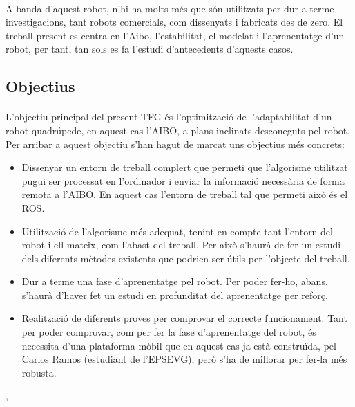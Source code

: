 \documentclass[12pt,a4paper,final,twoside]{article}
\begin{document}
\paragraph{}A banda d'aquest robot, n'hi ha molts més que són utilitzats per dur a terme investigacions, tant robots comercials, com dissenyats i fabricats des de zero. El treball present es centra en l'Aibo, l'estabilitat, el modelat i l'aprenentatge d'un robot, per tant, tan sols es fa l'estudi d'antecedents d'aquests casos.

\label{Objectius}
\subsection{Objectius}

\paragraph{}L'objectiu principal del present TFG és l'optimització de l'adaptabilitat d'un robot quadrúpede, en aquest cas l'AIBO, a plans inclinats desconeguts pel robot. Per arribar a aquest objectiu s'han hagut de marcat uns objectius més concrets:
\begin{itemize}
\item Dissenyar un entorn de treball complert que permeti que l'algorisme utilitzat pugui ser processat en l'ordinador i enviar la informació necessària de forma remota a l'AIBO. En aquest cas l'entorn de treball tal que permeti això és el ROS.
\item Utilització de l'algorisme més adequat, tenint en compte tant l'entorn del robot i ell mateix, com l'abast del treball. Per això s'haurà de fer un estudi dels diferents mètodes existents que podrien ser útils per l'objecte del treball.
\item Dur a terme una fase d'aprenentatge pel robot. Per poder fer-ho, abans, s'haurà d'haver fet un estudi en profunditat del aprenentatge per reforç.
\item Realització de diferents proves per comprovar el correcte funcionament. Tant per poder comprovar, com per fer la fase d'aprenentatge del robot, és necessita d'una plataforma mòbil que en aquest cas ja està construïda, pel Carlos Ramos (estudiant de l'EPSEVG)\cite{TFG_Carlos_Ramos}, però s'ha de millorar per fer-la més robusta.
\end{itemize},
\end{document}
